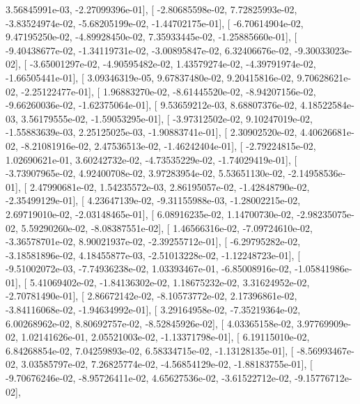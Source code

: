 \documentclass{article}
\begin{document}
          3.56845991e-03,  -2.27099396e-01],
       [ -2.80685598e-02,   7.72825993e-02,  -3.83524974e-02,
         -5.68205199e-02,  -1.44702175e-01],
       [ -6.70614904e-02,   9.47195250e-02,  -4.89928450e-02,
          7.35933445e-02,  -1.25885660e-01],
       [ -9.40438677e-02,  -1.34119731e-02,  -3.00895847e-02,
          6.32406676e-02,  -9.30033023e-02],
       [ -3.65001297e-02,  -4.90595482e-02,   1.43579274e-02,
         -4.39791974e-02,  -1.66505441e-01],
       [  3.09346319e-05,   9.67837480e-02,   9.20415816e-02,
          9.70628621e-02,  -2.25122477e-01],
       [  1.96883270e-02,  -8.61445520e-02,  -8.94207156e-02,
         -9.66260036e-02,  -1.62375064e-01],
       [  9.53659212e-03,   8.68807376e-02,   4.18522584e-03,
          3.56179555e-02,  -1.59053295e-01],
       [ -3.97312502e-02,   9.10247019e-02,  -1.55883639e-03,
          2.25125025e-03,  -1.90883741e-01],
       [  2.30902520e-02,   4.40626681e-02,  -8.21081916e-02,
          2.47536513e-02,  -1.46242404e-01],
       [ -2.79224815e-02,   1.02690621e-01,   3.60242732e-02,
         -4.73535229e-02,  -1.74029419e-01],
       [ -3.73907965e-02,   4.92400708e-02,   3.97283954e-02,
          5.53651130e-02,  -2.14958536e-01],
       [  2.47990681e-02,   1.54235572e-03,   2.86195057e-02,
         -1.42848790e-02,  -2.35499129e-01],
       [  4.23647139e-02,  -9.31155988e-03,  -1.28002215e-02,
          2.69719010e-02,  -2.03148465e-01],
       [  6.08916235e-02,   1.14700730e-02,  -2.98235075e-02,
          5.59290260e-02,  -8.08387551e-02],
       [  1.46566316e-02,  -7.09724610e-02,  -3.36578701e-02,
          8.90021937e-02,  -2.39255712e-01],
       [ -6.29795282e-02,  -3.18581896e-02,   4.18455877e-03,
         -2.51013228e-02,  -1.12248723e-01],
       [ -9.51002072e-03,  -7.74936238e-02,   1.03393467e-01,
         -6.85008916e-02,  -1.05841986e-01],
       [  5.41069402e-02,  -1.84136302e-02,   1.18675232e-02,
          3.31624952e-02,  -2.70781490e-01],
       [  2.86672142e-02,  -8.10573772e-02,   2.17396861e-02,
         -3.84116068e-02,  -1.94634992e-01],
       [  3.29164958e-02,  -7.35219364e-02,   6.00268962e-02,
          8.80692757e-02,  -8.52845926e-02],
       [  4.03365158e-02,   3.97769909e-02,   1.02141626e-01,
          2.05521003e-02,  -1.13371798e-01],
       [  6.19115010e-02,   6.84268854e-02,   7.04259893e-02,
          6.58334715e-02,  -1.13128135e-01],
       [ -8.56993467e-02,   3.03585797e-02,   7.26825774e-02,
         -4.56854129e-02,  -1.88183755e-01],
       [ -9.70676246e-02,  -8.95726411e-02,   4.65627536e-02,
         -3.61522712e-02,  -9.15776712e-02],
\end{document}
